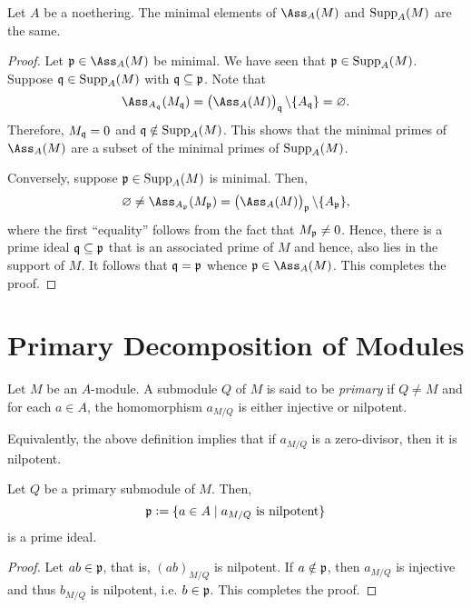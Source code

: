 \begin{lemma}
    Let $A$ be a noethering. The minimal elements of $\Ass_A(M)$ and $\operatorname{Supp}_A(M)$ are the same.
\end{lemma}
\begin{proof}
    Let $\frakp\in\Ass_A(M)$ be minimal. We have seen that $\mathfrak p\in\operatorname{Supp}_A(M)$. Suppose $\mathfrak q\in\operatorname{Supp}_A(M)$ with $\mathfrak q\subseteq\mathfrak p$. Note that 
    \begin{equation*}
        \Ass_{A_\frakq}(M_\frakq) = \left(\Ass_A(M)\right)_{\frakq}\backslash\{A_\frakq\} = \emptyset.
    \end{equation*}
    Therefore, $M_\mathfrak q = 0$ and $\mathfrak q\notin\operatorname{Supp}_A(M)$. This shows that the minimal primes of $\Ass_A(M)$ are a subset of the minimal primes of $\operatorname{Supp}_A(M)$.

    Conversely, suppose $\mathfrak p\in\operatorname{Supp}_A(M)$ is minimal. Then, 
    \begin{equation*}
        \emptyset\ne\Ass_{A_\frakp}(M_\frakp) = \left(\Ass_A(M)\right)_\frakp\backslash\{A_\frakp\},
    \end{equation*}
    where the first ``equality'' follows from the fact that $M_\mathfrak p\ne 0$. Hence, there is a prime ideal $\mathfrak q\subseteq\mathfrak p$ that is an associated prime of $M$ and hence, also lies in the support of $M$. It follows that $\mathfrak q = \mathfrak p$ whence $\frakp\in\Ass_A(M)$. This completes the proof.
\end{proof}


\section{Primary Decomposition of Modules}

\begin{definition}
    Let $M$ be an $A$-module. A submodule $Q$ of $M$ is said to be \emph{primary} if $Q\ne M$ and for each $a\in A$, the homomorphism $a_{M/Q}$ is either injective or nilpotent.

    Equivalently, the above definition implies that if $a_{M/Q}$ is a zero-divisor, then it is nilpotent.
\end{definition}


\begin{proposition}
    Let $Q$ be a primary submodule of $M$. Then, 
    \begin{equation*}
        \mathfrak p := \{a\in A\mid a_{M/Q}\text{ is nilpotent}\}
    \end{equation*}
    is a prime ideal.
\end{proposition}
\begin{proof}
    Let $ab\in\mathfrak p$, that is, $(ab)_{M/Q}$ is nilpotent. If $a\notin\mathfrak p$, then $a_{M/Q}$ is injective and thus $b_{M/Q}$ is nilpotent, i.e. $b\in\mathfrak p$. This completes the proof.
\end{proof}
